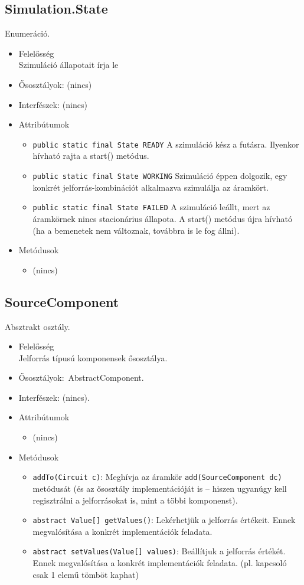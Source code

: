 \subsection{Simulation.State}
Enumeráció.
\begin{itemize}
\item Felelősség\\
Szimuláció állapotait írja le
\item Ősosztályok: (nincs)
\item Interfészek: (nincs)
\item Attribútumok $\ $
\begin{itemize}
	\item \texttt{public static final State READY} A szimuláció kész a futásra. Ilyenkor hívható rajta a start() metódus.
	\item \texttt{public static final State WORKING} Szimuláció éppen dolgozik, egy konkrét jelforrás-kombinációt alkalmazva szimulálja az áramkört.
	\item \texttt{public static final State FAILED} A szimuláció leállt, mert az áramkörnek nincs stacionárius állapota. A start() metódus újra hívható (ha a bemenetek nem változnak, továbbra is le fog állni).
\end{itemize}
\item Metódusok$\ $
\begin{itemize}
\item (nincs)
\end{itemize}
\end{itemize}

\subsection{SourceComponent}
Absztrakt osztály.
\begin{itemize}
\item Felelősség\\
Jelforrás típusú komponensek ősosztálya.
\item Ősosztályok:\ AbstractComponent.
\item Interfészek: (nincs).
\item Attribútumok $\ $
\begin{itemize}
	\item (nincs)
\end{itemize}
\item Metódusok$\ $
\begin{itemize}
\item \texttt{addTo(Circuit c)}: Meghívja az áramkör \texttt{add(SourceComponent dc)} metódusát (és az ősosztály implementációját is -- hiszen ugyanúgy kell regisztrálni a jelforrásokat is, mint a többi komponenst).
	\item \texttt{abstract Value[] getValues()}: Lekérhetjük a jelforrás értékeit. Ennek megvalósítása a konkrét implementációk feladata.
	\item \texttt{abstract setValues(Value[] values)}: Beállítjuk a jelforrás értékét. Ennek megvalósítása a konkrét implementációk feladata. (pl. kapcsoló csak 1 elemű tömböt kaphat)
\end{itemize}
\end{itemize}






